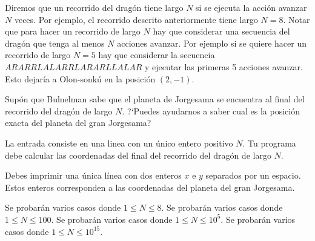 \documentclass{oci}
\begin{document}
Diremos que un recorrido del dragón tiene largo $N$ si se ejecuta la acción avanzar $N$ veces.
Por ejemplo, el recorrido descrito anteriormente tiene largo $N = 8$.
Notar que para hacer un recorrido de largo $N$ hay que considerar una secuencia del dragón que tenga al menos $N$ acciones avanzar.
Por ejemplo si se quiere hacer un recorrido de largo $N=5$ hay que considerar la secuencia $ARARRLALARRLARARLLALAR$ y ejecutar
las primeras 5 acciones avanzar.
Esto dejaría a Olon-sonkú en la posición $(2,-1)$.

Supón que Bulnelman sabe que el planeta de Jorgesama se encuentra al final del recorrido del dragón de largo $N$.
?`Puedes ayudarnos a saber cual es la posición exacta del planeta del gran Jorgesama?


\begin{inputDescription}
La entrada consiste en una linea con un único entero positivo $N$.
Tu programa debe calcular las coordenadas del final del recorrido del dragón de largo $N$.
\end{inputDescription}

\begin{outputDescription}
Debes imprimir una única línea con dos enteros $x$ e $y$ separados por un espacio.
Estos enteros corresponden a las coordenadas del planeta del gran Jorgesama.
\end{outputDescription}

\begin{scoreDescription}
 Se probarán varios casos donde $1 \leq N \leq 8$.
 Se probarán varios casos donde $1 \leq N \leq 100$.
 Se probarán varios casos donde $1 \leq N \leq 10^5$.
 Se probarán varios casos donde $1 \leq N \leq 10^{15}$. 
\end{scoreDescription}

\begin{sampleDescription}
\end{sampleDescription}
\end{document}
